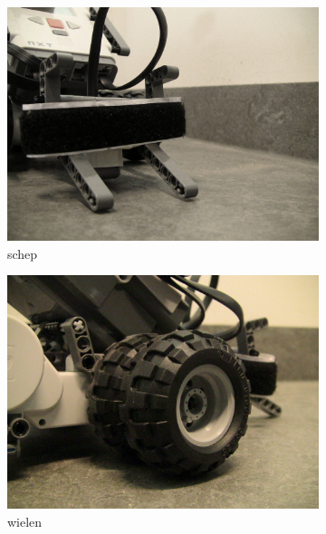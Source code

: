 \documentclass[tt3]{penoverslag}
\begin{document}
\begin{figure}
\centering
	\begin{subfigure}[h]{0.325\textwidth}
	\centering
		\includegraphics[width=\textwidth]{robotSchep}
		\caption{schep}
	\end{subfigure}
	\begin{subfigure}[h]{0.325\textwidth}
		\centering
		\includegraphics[width=\textwidth]{robotWielen}
		\caption{wielen}
	\end{subfigure}
	\begin{subfigure}[h]{0.325\textwidth}
		\centering

\end{subfigure}
\end{figure}
\end{document}
